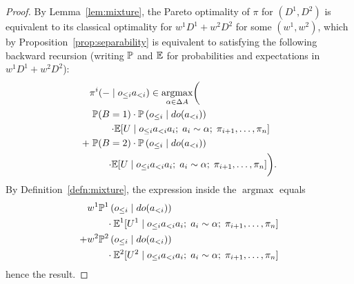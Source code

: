 \documentclass{article}
\newcommand{\hist}[1]{o_{\le #1}a_{<#1}}
\newcommand{\dohist}[1]{o_{\le #1} \mid do(a_{<#1})}
\newcommand{\bool}{B}
\newcommand{\lem}[1]{Lemma~\ref{lem:#1}}
\newcommand{\defn}[1]{Definition~\ref{defn:#1}}
\newcommand{\prop}[1]{Proposition~\ref{prop:#1}}
\DeclareMathOperator*{\argmax}{argmax}
\begin{document}
\begin{proof}
By \lem{mixture}, the Pareto optimality of $\pi$ for $(D^1,D^2)$ is equivalent to its classical optimality for
$w^1D^1 + w^2D^2$ for some $(w^1,w^2)$, which by \prop{separability} is equivalent to satisfying the following backward recursion (writing $\mathbb{P}$ and $\mathbb{E}$ for probabilities and expectations in $w^1D^1 + w^2D^2$):
\begin{align*}
&\pi^i(-\mid\hist{i}) \in \argmax_{\alpha\in\Delta A} \biggl(\vphantom{\left(\left(\right)\right)}\biggr.\\
& \left.\PP(\bool =1)\cdot \PP\left(\dohist{i}\right)\right. \\
 & \quad \quad \left.\cdot \EE[U \mid \hist{i} a_i ;\; a_i\sim \alpha;\; \pi_{i+1},\ldots,\pi_n]\right.\\
+ & \left.\PP(\bool =2)\cdot \PP\left(\dohist{i}\right)\right. \\
 & \quad \quad \biggl.\cdot \EE[U \mid \hist{i} a_i;\; a_i\sim \alpha;\; \pi_{i+1},\ldots,\pi_n] \biggr).
\end{align*}
By \defn{mixture}, the expression inside the $\argmax$ equals 
\begin{align*}
& w^1 \PP^1\left(\dohist{i}\right) \\
& \quad \quad \cdot \EE^1[U^1 \mid \hist{i} a_i ;\; a_i\sim \alpha;\; \pi_{i+1},\ldots,\pi_n]\\
+ & w^2 \PP^2\left(\dohist{i}\right) \\
& \quad \quad \cdot \EE^2[U^2 \mid \hist{i} a_i;\; a_i\sim \alpha;\; \pi_{i+1},\ldots,\pi_n]
\end{align*}
hence the result.
\end{proof}
\end{document}
